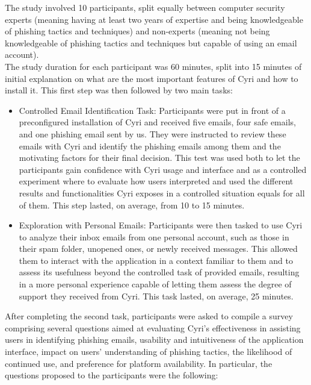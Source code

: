 The study involved 10 participants, split equally between computer security
experts (meaning having at least two years of expertise and being knowledgeable of phishing tactics and techniques) and non-experts (meaning not being knowledgeable of phishing tactics and techniques but capable of using an email account).\\
The study duration for each participant was 60 minutes, split into 15 minutes of initial explanation on what are the most important features of Cyri and how to install it. This first step was then followed by two main tasks:
\begin{itemize}
    \item Controlled Email Identification Task: Participants were put in front of a preconfigured installation of Cyri and received five emails, four safe emails, and one phishing email sent by us. They were instructed to review these emails with Cyri and identify the phishing emails among them and the motivating factors for their final decision.
    This test was used both to let the participants gain confidence with Cyri usage and interface and as a controlled experiment where to evaluate how users interpreted and used the different results and functionalities Cyri exposes in a controlled situation equals for all of them. This step lasted, on average, from 10 to 15 minutes.
    \item Exploration with Personal Emails: Participants were then tasked to use Cyri to analyze their inbox emails from one personal account, such as those in their spam folder, unopened ones, or newly received messages. This allowed them to interact with the application in a context familiar to them and to assess its usefulness beyond the controlled task of provided emails, resulting in a more personal experience capable of letting them assess the degree of support they received from Cyri. This task lasted, on average, 25 minutes.
\end{itemize}
After completing the second task, participants were asked to compile a survey
comprising several questions aimed at evaluating Cyri’s effectiveness in assisting users in identifying phishing emails, usability and intuitiveness of the application interface, impact on users' understanding of phishing tactics, the likelihood of continued use, and preference for platform availability.
In particular, the questions proposed to the participants were the following:

